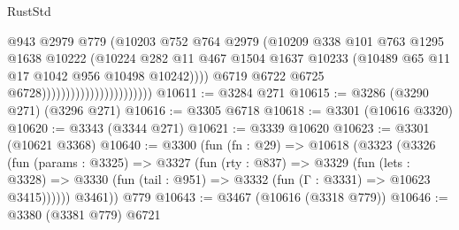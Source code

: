\begin{lexlean}{RustStd}
\begin{coremodule}
                                                  @943
                                                  @2979
                                                  @779
                                                  (@10203
                                                    @752
                                                    @764
                                                    @2979
                                                    (@10209
                                                      @338
                                                      @101
                                                      @763
                                                      @1295
                                                      @1638
                                                      @10222
                                                      (@10224
                                                        @282
                                                        @11
                                                        @467
                                                        @1504
                                                        @1637
                                                        @10233
                                                        (@10489
                                                          @65
                                                          @11
                                                          @17
                                                          @1042
                                                          @956
                                                          @10498
                                                          @10242))))
                                                  @6719
                                                  @6722
                                                  @6725
                                                  @6728)))))))))))))))))))))))
@10611 := @3284 @271
@10615 := @3286 (@3290 @271) (@3296 @271)
@10616 := @3305 @6718
@10618 := @3301 (@10616 @3320)
@10620 := @3343 (@3344 @271)
@10621 := @3339 @10620
@10623 := @3301 (@10621 @3368)
@10640 := @3300
    (fun (fn : @29) =>
    @10618
      (@3323
        (@3326
          (fun (params : @3325) =>
          @3327
            (fun (rty : @837) =>
            @3329
              (fun (lets : @3328) =>
              @3330 (fun (tail : @951) => @3332 (fun (Γ : @3331) => @10623 @3415))))))
        @3461))
    @779
@10643 := @3467 (@10616 (@3318 @779))
@10646 := @3380 (@3381 @779) @6721

\end{coremodule}
\end{lexlean}
